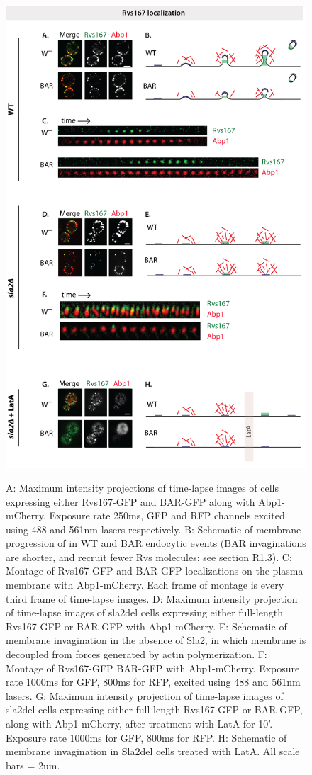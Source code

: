 \begin{figure}
	\centering
	\includegraphics[width=18cm,height=18cm,keepaspectratio]{figures/results_final/sla2_del_final6}
	\caption [Localization of Rvs167 and BAR with and without membrane curvature]
	{A: Maximum intensity projections of time-lapse images of cells expressing either Rvs167-GFP and BAR-GFP along with Abp1-mCherry. Exposure rate 250ms, GFP and RFP channels excited using 488 and 561nm lasers respectively. B: Schematic of membrane progression of in WT and BAR endocytic events (BAR invaginations are shorter, and recruit fewer Rvs molecules: see section R1.3).
	C: Montage of Rvs167-GFP and BAR-GFP localizations on the plasma membrane with Abp1-mCherry. Each frame of montage is every third frame of time-lapse images. 
	D: Maximum intensity projection of time-lapse images of sla2del cells expressing either full-length Rvs167-GFP or BAR-GFP with Abp1-mCherry. 
	E: Schematic of membrane invagination in the absence of Sla2, in which membrane is decoupled from forces generated by actin polymerization. F: Montage of Rvs167-GFP BAR-GFP with Abp1-mCherry. Exposure rate 1000ms for GFP, 800ms for RFP, excited using 488 and 561nm lasers. 
	G: Maximum intensity projection of time-lapse images of sla2del cells expressing either full-length Rvs167-GFP or BAR-GFP, along with Abp1-mCherry, after treatment with LatA for 10’. Exposure rate 1000ms for GFP, 800ms for RFP. H: Schematic of membrane invagination in Sla2del cells treated with LatA. 
	All scale bars = 2um.
	\label{fig2_sla2del}}
	\end{figure}

